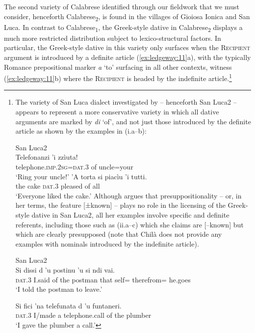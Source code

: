 \documentclass[output=paper,modfonts,nonflat,colorlinks,citecolor=brown]{langsci/langscibook}
\begin{document}
The second variety of Calabrese identified through our fieldwork that we must consider, henceforth Calabrese\textsubscript{2}, is found in the villages of Gioiosa Ionica and San Luca. In contrast to Calabrese\textsubscript{1}, the Greek-style dative in Calabrese\textsubscript{2} displays a much more restricted distribution subject to lexico-structural factors. In particular, the Greek-style dative in this variety only surfaces when the \textsc{Recipient} argument is introduced by a definite article (\ref{ex:ledgeway:11}a), with the typically Romance prepositional marker \textit{a} ‘to’ surfacing in all other contexts, witness (\ref{ex:ledgeway:11}b) where the \textsc{Recipient} is headed by the indefinite article.\footnote{The
    variety of San Luca dialect investigated by \citet{Chilà2017} – henceforth San Luca2 – appears to represent a more conservative variety in which all dative arguments are marked by \textit{di} ‘of’, and not just those introduced by the definite article as shown by the examples in (i.a--b):
    
    \ea
    San Luca2 \\
    \ea
    \gll Telefonanzi  ’i  zzìuta!   \\
        telephone.\textsc{imp.2sg=dat.3}  of  uncle=your  \\
        \glt `Ring your uncle!' 
    \ex  ’A  torta  si  piacìu  ’i  tutti.\\
        the  cake  \textsc{dat}.3  pleased  of  all  \\
        \glt `Everyone liked the cake.'
        \z
        \z        
        Although \citet[4--5]{Chilà2017} argues that presuppositionality – or, in her terms, the feature [±known] – plays no role in the licensing of the Greek-style dative in San Luca2, all her examples involve specific and definite referents, including those such as (ii.a--c) which she claims are [–known] but which are clearly presupposed (note that Chilà does not provide any examples with nominals introduced by the indefinite article).  
    
    \ea
    San Luca2 \\
    \ea 
    \gll Si  dissi  d  ’u  postinu  ’u  si  ndi  vai.\\
    \textsc{dat}.3  I.said  of  the  postman  that  self=  therefrom=  he.goes\\
    \glt `I told the postman to leave.'  
    
    \ex
    \gll Si  fici  ’na  telefunata  d  ’u  funtaneri.\\
    \textsc{dat}.3  I/made  a  telephone.call  of  the  plumber \\
    \glt `I gave the plumber a call.' 
    
}
\end{document}
